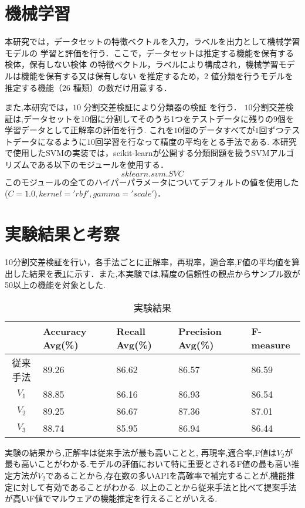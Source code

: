 \documentclass{thesis}
\begin{document}
\section{機械学習}
本研究では，データセットの特徴ベクトルを入力，ラベルを出力として機械学習モデルの
学習と評価を行う．ここで，データセットは推定する機能を保有する検体，保有しない検体
の特徴ベクトル，ラベルにより構成され，機械学習モデルは機能を保有する又は保有しない
を推定するため，2 値分類を行うモデルを推定する機能（$26$ 種類）の数だけ用意する．

また,本研究では，$10$ 分割交差検証により分類器の検証
を行う．
$10$分割交差検証は,データセットを10個に分割してそのうち1つをテストデータに残りの$9$個を学習データとして正解率の評価を行う.
これを$10$個のデータすべてが$1$回ずつテストデータになるように$10$回学習を行なって精度の平均をとる手法である.
本研究で使用したSVMの実装では，scikit-learnが公開する分類問題を扱うSVMアルゴリズムである以下のモジュールを使用する\cite{svm}．
\[
	sklearn.svm.SVC
\]
このモジュールの全てのハイパーパラメータについてデフォルトの値を使用した($C=1.0, kernel='rbf', gamma='scale'$)．

\section{実験結果と考察}
10分割交差検証を行い，各手法ごとに正解率，再現率，適合率,F値の平均値を算出した結果を表\ref{table:average}に示す．また,本実験では,精度の信頼性の観点からサンプル数が50以上の機能を対象とした.
\begin{table}[H]
	\caption{実験結果}
	\label{table:average}
	\begin{center}
		\begin{tabular}{|c||p{28mm}|p{28mm}|p{28mm}|p{28mm}|} \hline
			 & Accuracy Avg(\%) & Recall Avg(\%) & Precision Avg(\%) & F-measure \\ \hline \hline
			従来手法 & 89.26 & 86.62 &86.57 & 86.59  \\ \hline
			$V_1$ & 88.85  & 86.16 & 86.93 & 86.54 \\ \hline
			$V_2$ & 89.25 & 86.67 & 87.36 & 87.01 \\ \hline
			$V_3$ & 88.74 & 85.95 &86.94 & 86.44 \\ \hline
		\end{tabular}
	\end{center}
\end{table}
実験の結果から,正解率は従来手法が最も高いことと, 再現率,適合率,F値は$V_2$が最も高いことがわかる.モデルの評価において特に重要とされるF値の最も高い推定方法が$V_2$であることから,存在数の多いAPIを高確率で補完することが,機能推定に対して有効であることがわかる.
以上のことから従来手法と比べて提案手法が高いF値でマルウェアの機能推定を行えることがいえる.
\end{document}

